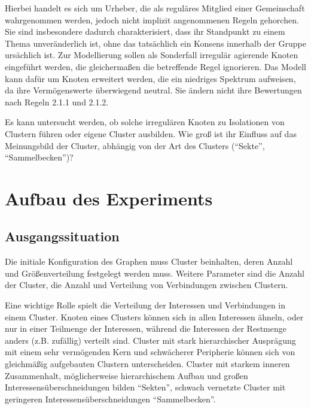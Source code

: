 \documentclass[11pt, a4paper]{scrartcl}
\begin{document}
Hierbei handelt es sich um Urheber, die als reguläres Mitglied einer Gemeinschaft  wahrgenommen werden, jedoch nicht implizit angenommenen Regeln gehorchen. Sie sind insbesondere dadurch charakterisiert, dass ihr Standpunkt zu einem Thema unveränderlich ist, ohne das tatsächlich ein Konsens innerhalb der Gruppe ursächlich ist. Zur Modellierung sollen als Sonderfall irregulär agierende Knoten eingeführt werden, die gleichermaßen die betreffende Regel ignorieren. Das Modell kann dafür um Knoten erweitert werden, die ein niedriges Spektrum aufweisen, da ihre Vermögenswerte überwiegend neutral. Sie ändern nicht ihre Bewertungen nach Regeln 2.1.1 und 2.1.2.

Es kann untersucht werden, ob solche irregulären Knoten zu Isolationen von Clustern führen oder eigene Cluster ausbilden. Wie groß ist ihr Einfluss auf das Meinungsbild der Cluster, abhängig von der Art des Clusters ("`Sekte"', "`Sammelbecken"')?


\section{Aufbau des Experiments}
\subsection{Ausgangssituation}
Die initiale Konfiguration des Graphen muss Cluster beinhalten, deren Anzahl und Größenverteilung festgelegt werden muss. Weitere Parameter sind die Anzahl der Cluster, die Anzahl und Verteilung von Verbindungen zwischen Clustern.

Eine wichtige Rolle spielt die Verteilung der Interessen und Verbindungen in einem Cluster. Knoten eines Clusters können sich in allen Interessen ähneln, oder nur in einer Teilmenge der Interessen, während die Interessen der Restmenge anders (z.B. zufällig) verteilt sind. Cluster mit stark hierarchischer Ausprägung mit einem sehr vermögenden Kern und schwächerer Peripherie können sich von gleichmäßig aufgebauten Clustern unterscheiden. Cluster mit starkem inneren Zusammenhalt, möglicherweise hierarchischem Aufbau und großen Interessensüberschneidungen bilden "`Sekten"', schwach vernetzte Cluster mit geringeren Interessensüberschneidungen "`Sammelbecken"'.
\end{document}
